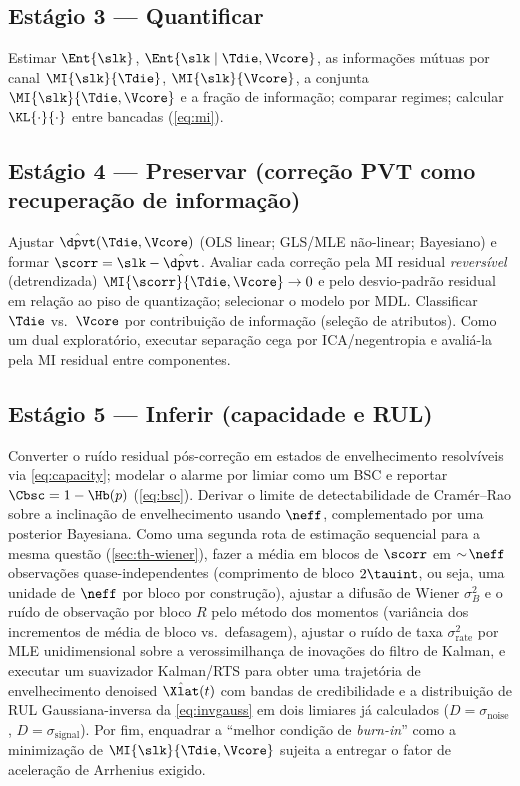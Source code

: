 \subsection{Estágio 3 --- Quantificar}
Estimar $\Ent{\slk}$, $\Ent{\slk\mid\Tdie,\Vcore}$, as informações mútuas por
canal $\MI{\slk}{\Tdie}$, $\MI{\slk}{\Vcore}$, a conjunta
$\MI{\slk}{\Tdie,\Vcore}$ e a fração de informação; comparar regimes;
calcular $\KL{\cdot}{\cdot}$ entre bancadas (\cref{eq:mi}).

\subsection{Estágio 4 --- Preservar (correção PVT como recuperação de informação)}
Ajustar $\hat{\dpvt}(\Tdie,\Vcore)$ (OLS linear; GLS/MLE não-linear;
Bayesiano) e formar $\scorr=\slk-\hat{\dpvt}$. Avaliar cada correção pela MI
residual \emph{reversível} (detrendizada) $\MI{\scorr}{\Tdie,\Vcore}\to 0$ e
pelo desvio-padrão residual em relação ao piso de quantização; selecionar o
modelo por MDL. Classificar $\Tdie$ vs.\ $\Vcore$ por contribuição de
informação (seleção de atributos). Como um dual exploratório, executar
separação cega por ICA/negentropia e avaliá-la pela MI residual entre
componentes.

\subsection{Estágio 5 --- Inferir (capacidade e RUL)}
Converter o ruído residual pós-correção em estados de envelhecimento
resolvíveis via \cref{eq:capacity}; modelar o alarme por limiar como um BSC e
reportar $\Cbsc=1-\Hb(p)$ (\cref{eq:bsc}). Derivar o limite de
detectabilidade de Cram\'er--Rao sobre a inclinação de envelhecimento usando
$\neff$, complementado por uma posterior Bayesiana. Como uma segunda rota de
estimação sequencial para a mesma questão (\cref{sec:th-wiener}), fazer a
média em blocos de $\scorr$ em $\sim\!\neff$ observações
quase-independentes (comprimento de bloco $2\tauint$, ou seja, uma unidade de
$\neff$ por bloco por construção), ajustar a difusão de Wiener $\sigma_B^2$ e
o ruído de observação por bloco $R$ pelo método dos momentos (variância dos
incrementos de média de bloco vs.\ defasagem), ajustar o ruído de taxa
$\sigma_{\mathrm{rate}}^2$ por MLE unidimensional sobre a verossimilhança de
inovações do filtro de Kalman, e executar um suavizador Kalman/RTS para
obter uma trajetória de envelhecimento denoised $\hat\Xlat(t)$ com bandas de
credibilidade e a distribuição de RUL Gaussiana-inversa da
\cref{eq:invgauss} em dois limiares já calculados
($D=\sigma_{\text{noise}}$, $D=\sigma_{\text{signal}}$). Por fim, enquadrar a
``melhor condição de \emph{burn-in}'' como a minimização de
$\MI{\slk}{\Tdie,\Vcore}$ sujeita a entregar o fator de aceleração de
Arrhenius exigido.

